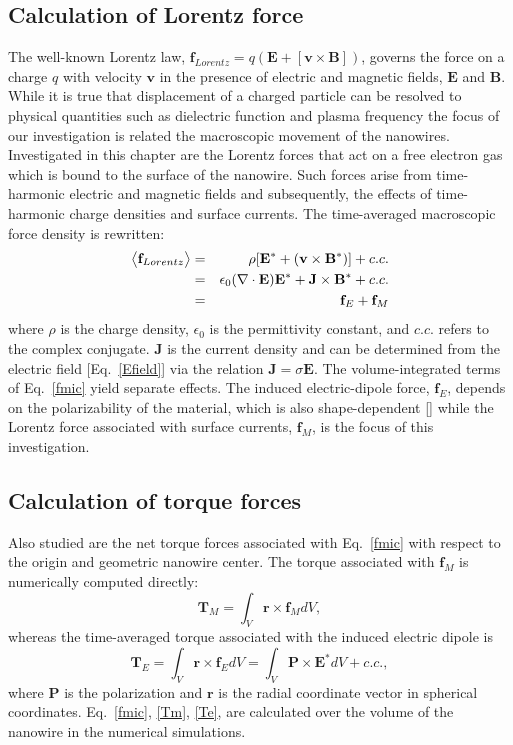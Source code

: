 \subsection{Calculation of Lorentz force}
The well-known Lorentz law, $\mathbf{f}_{Lorentz} = q(\mathbf{E} + [\mathbf{v} \times \mathbf{B}])$, governs the force on a charge $q$ with velocity $\mathbf{v}$ in the presence of electric and magnetic fields, $\mathbf{E}$ and $\mathbf{B}$. While it is true that displacement of a charged particle can be resolved to physical quantities such as dielectric function and plasma frequency the focus of our investigation is related the macroscopic movement of the nanowires.
Investigated in this chapter are the Lorentz forces that act on a free electron gas which is bound to the surface of the nanowire. Such forces arise from time-harmonic electric and magnetic fields and subsequently, the effects of time-harmonic charge densities and surface currents. The time-averaged macroscopic force density is rewritten:
\begin{eqnarray}
\big{<}\mathbf{f}_{Lorentz}\big{>}&=& \rho[\mathbf{E^*}+(\mathbf{v}\times\mathbf{B}^*)] + c.c. \\
&=& \epsilon_0(\nabla \cdot \mathbf{E})\mathbf{E}^* + \mathbf{J}\times\mathbf{B}^* + c.c. \label{fmic}\\
&=&\mathbf{f}_E + \mathbf{f}_M
\end{eqnarray}
where $\rho$ is the charge density, $\epsilon_0$ is the permittivity constant, and $c.c.$ refers to the complex conjugate. $\mathbf{J}$ is the current density and can be determined from the electric field [Eq.~\ref{Efield}] via the relation $\textbf{J} = \sigma\textbf{E}$. The volume-integrated terms of Eq.~\ref{fmic} yield separate effects.  The induced electric-dipole force, $\mathbf{f}_E$, depends on the polarizability of the material, which is also shape-dependent [\cite{Liaw}] while the Lorentz force associated with surface currents, $\mathbf{f}_M$, is the focus of this investigation.

\subsection{Calculation of torque forces}
Also studied are the net torque forces associated with Eq.~\ref{fmic} with respect to the origin and geometric nanowire center. The torque associated with $\mathbf{f}_M$ is numerically computed directly:
\begin{equation}
\mathbf{T}_M=\int_V \mathbf{r} \times \mathbf{f}_M dV,\label{Tm}
\end{equation}
whereas the time-averaged torque associated with the induced electric dipole is
\begin{equation}
\mathbf{T}_E=\int_V \mathbf{r} \times \mathbf{f}_E dV=\int_V \mathbf{P} \times \mathbf{E}^* dV+ c.c.,
\label{Te}
\end{equation}
where $\mathbf{P}$ is the polarization and $\mathbf{r}$ is the radial coordinate vector in spherical coordinates. Eq.~\ref{fmic}, \ref{Tm}, \ref{Te}, are calculated over the volume of the nanowire in the numerical simulations.

